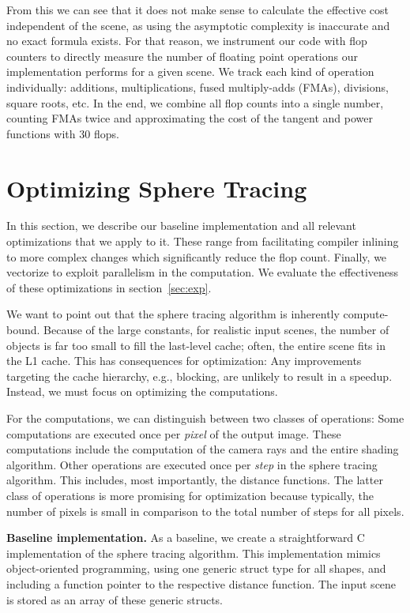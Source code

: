 \documentclass[letterpaper]{article}
\newcommand{\mypar}[1]{{\bf #1.}}
\begin{document}
From this we can see that it does not make sense to calculate the effective cost independent of the scene, as using the
asymptotic complexity is inaccurate and no exact formula exists.
For that reason, we instrument our code with flop counters to directly measure the number of floating point operations our implementation performs for a given scene.
We track each kind of operation individually: additions, multiplications, fused multiply-adds (FMAs), divisions, square roots, etc.
In the end, we combine all flop counts into a single number, counting FMAs twice and approximating the cost of the tangent and power functions with 30 flops.

\section{Optimizing Sphere Tracing}\label{sec:yourmethod}
In this section, we describe our baseline implementation and all relevant optimizations that we apply to it. These range from facilitating compiler inlining to more complex changes which significantly reduce the flop count. Finally, we vectorize to exploit parallelism in the computation.
We evaluate the effectiveness of these optimizations in section~\ref{sec:exp}.

We want to point out that the sphere tracing algorithm is inherently compute-bound. Because of the large constants, 
for realistic input scenes, the number of objects is far too small to fill the last-level cache;
often, the entire scene fits in the L1 cache.
This has consequences for optimization: Any improvements targeting the cache hierarchy, e.g., blocking, are unlikely to result in a speedup. Instead, we must focus on optimizing the computations.

For the computations, we can distinguish between two classes of operations: Some computations are executed once per \emph{pixel} of the output image. These computations include the computation of the camera rays and the entire shading algorithm. Other operations are executed once per \emph{step} in the sphere tracing algorithm. This includes, most importantly, the distance functions. The latter class of operations is more promising for optimization because typically, the number of pixels is small in comparison to the total number of steps for all pixels.

\mypar{Baseline implementation}
As a baseline, we create a straightforward C implementation of the sphere tracing algorithm. This implementation mimics object-oriented programming, using one generic struct type for all shapes, and including a function pointer to the respective distance function.
The input scene is stored as an array of these generic structs.
\end{document}
